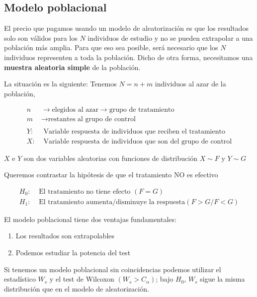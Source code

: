 \subsection{Modelo poblacional}

El precio que pagamos usando un modelo de aleatorización es que los resultados solo son válidos para los $N$ individuos de estudio y no se pueden extrapolar a una población más amplia.
Para que eso sea posible, será necesario que los $N$ individuos representen a toda la población. Dicho de otra forma, necesitamos una \textbf{muestra aleatoria simple} de la población.

La situación es la siguiente:
Tenemos $N=n+m$ individuos al azar de la población,

$$
\begin{aligned}
    n & \longrightarrow \text{elegidos al azar}\longrightarrow \text{grupo de tratamiento} \\
    m & \longrightarrow \text{restantes al grupo de control} \\
    \ & \ \\
    Y: & \text{ Variable respuesta de individuos que reciben el tratamiento}\\
    X: & \text{ Variable respuesta de individuos que son del grupo de control}  
\end{aligned}
$$

$X$ e $Y$ son dos variables aleatorias con funciones de distribución $X\sim F$ y $Y\sim G$ \\

\newpage

\noindent Queremos contrastar la hipótesis de que el tratamiento NO es efectivo

$$
\begin{aligned}
    H_0: & \text{ El tratamiento no tiene efecto }(F=G) \\
    H_1: & \text{ El tratamiento aumenta/disminuye la respuesta} (F>G/F<G)  
\end{aligned}
$$

El modelo poblacional tiene dos ventajas fundamentales:
\begin{enumerate}
    \item Los resultados son extrapolables
    \item Podemos estudiar la potencia del test
\end{enumerate}

\noindent Si tenemos un modelo poblacional sin coincidencias podemos utilizar el estadístico $W_s$ y el test de Wilcoxon $(W_s>C_\alpha)$; bajo $H_0$, $W_s$ sigue la misma distribución que en el modelo de aleatorización.

